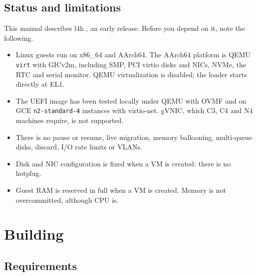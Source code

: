 \documentclass[11pt,a4paper]{report}
\begin{document}
\section{Status and limitations}

This manual describes l4h \lfourhversion, an early release. Before you depend on it, note the following.
\begin{itemize}
  \item Linux guests run on x86\_64 and AArch64. The AArch64 platform
        is QEMU \texttt{virt} with GICv2m, including SMP, PCI virtio disks
        and NICs, NVMe, the RTC and serial monitor. QEMU virtualization
        is disabled; the loader starts directly at EL1.
  \item The UEFI image has been tested locally under QEMU with OVMF and on
        GCE \texttt{n2-standard-4} instances with virtio-net. gVNIC,
        which C3, C4 and N4 machines require, is not supported.
  \item There is no pause or resume, live migration, memory ballooning,
        multi-queue disks, discard, I/O rate limits or VLANs.
  \item Disk and NIC configuration is fixed when a VM is created: there is
        no hotplug.
  \item Guest RAM is reserved in full when a VM is created. Memory is not
        overcommitted, although CPU is.
\end{itemize}

\chapter{Building}
\label{ch:build}

\section{Requirements}
\end{document}
